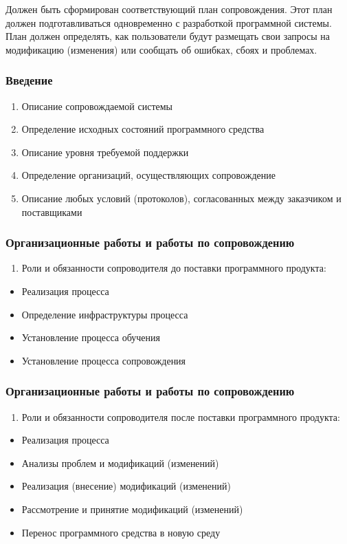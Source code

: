 \documentclass{../industrial-development}
\begin{document}
\lecturenotes
Должен быть сформирован соответствующий план сопровождения. Этот план должен подготавливаться одновременно с разработкой программной системы. План должен определять, как пользователи будут размещать свои запросы на модификацию (изменения) или сообщать об ошибках, сбоях и проблемах. 

\begin{frame} \frametitle{Введение}
	\begin{enumerate}
		\item Описание сопровождаемой системы
		\item Определение исходных состояний программного средства 
		\item Описание уровня требуемой поддержки
		\item Определение организаций, осуществляющих сопровождение 
		\item Описание любых условий (протоколов), согласованных между заказчиком и поставщиками 
	\end{enumerate}
\end{frame}

\lecturenotes


\begin{frame} \frametitle{Организационные работы и работы по сопровождению}
	\begin{enumerate} \item Роли и обязанности сопроводителя до поставки программного продукта:\end{enumerate}
	\begin{itemize}
	\item Реализация процесса 
	\item Определение инфраструктуры процесса 
	\item Установление процесса обучения 
	\item Установление процесса сопровождения 
	\end{itemize}
\end{frame}

\lecturenotes

\begin{frame} \frametitle{Организационные работы и работы по сопровождению}
	\begin{enumerate}[2] \item Роли и обязанности сопроводителя после поставки программного продукта:  \end{enumerate}
	\begin{itemize}
		\item Реализация процесса
		\item Анализы проблем и модификаций (изменений)  
		\item Реализация (внесение) модификаций (изменений) 
		\item Рассмотрение и принятие модификаций (изменений) 
		\item Перенос программного средства в новую среду
	\end{itemize}
\end{frame}
\end{document}
